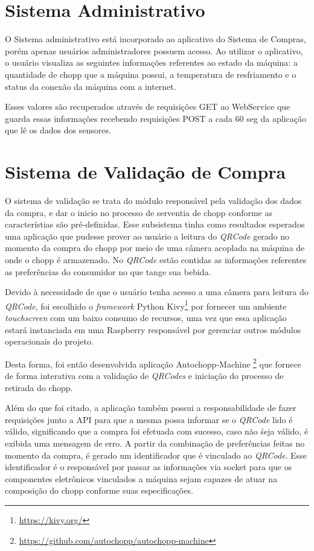 \section[Sistema Administrativo]{Sistema Administrativo}

O Sistema administrativo está incorporado ao aplicativo do Sistema de Compras, porém apenas usuários
administradores possuem acesso. Ao utilizar o aplicativo, o usuário visualiza
as seguintes informações referentes ao estado da máquina: a quantidade de chopp que a
máquina possui, a temperatura de resfriamento e o status da conexão da máquina com a internet.

Esses valores são recuperados através de requisições GET ao WebService que guarda essas informações recebendo
requisições POST a cada 60 seg da aplicação que lê os dados dos sensores. 

\section[Sistema de Validação de Compra]{Sistema de Validação de Compra}

O sistema de validação se trata do módulo responsável pela validação dos dados da compra,
e dar o inicio no processo de serventia de chopp conforme as característias são pré-definidas.
Esse subsistema tinha como resultados esperados uma aplicação que pudesse prover ao usuário
a leitura do \textit{QRCode} gerado no momento da compra do chopp por meio de uma câmera 
acoplada na máquina de onde o chopp é armazenado. No \textit{QRCode} estão contidas as informações
referentes as preferências do consumidor no que tange sua bebida.

Devido à necessidade de que o usuário tenha acesso a uma câmera para leitura do \textit{QRCode},
foi escolhido o \textit{framework} Python Kivy\footnote{\url{https://kivy.org/}} por fornecer um ambiente
\textit{touchscreen} com um baixo consumo de recursos, uma vez que essa aplicação estará 
instanciada em uma Raspberry responsável por gerenciar outros módulos operacionais do projeto.

Desta forma, foi então desenvolvida aplicação Autochopp-Machine \footnote{\url{https://github.com/autochopp/autochopp-machine}} que fornece de forma interativa 
com a validação de \textit{QRCodes} e iniciação do processo de retirada do chopp. 

Além do que foi citado, a aplicação também possui a responsabilidade de fazer requisições junto a API
para que a mesma possa informar se o \textit{QRCode} lido é válido, significando que a compra foi 
efetuada com sucesso, caso não śeja válido, é exibida uma mensagem de erro. A partir da combinação
de preferências feitas no momento da compra, é gerado um identificador que é vinculado ao 
\textit{QRCode}. Esse identificador é o responsável por passar as informações via socket para que
os componentes eletrônicos vinculados a máquina sejam capazes de atuar na composição do chopp conforme
suas especificações.

